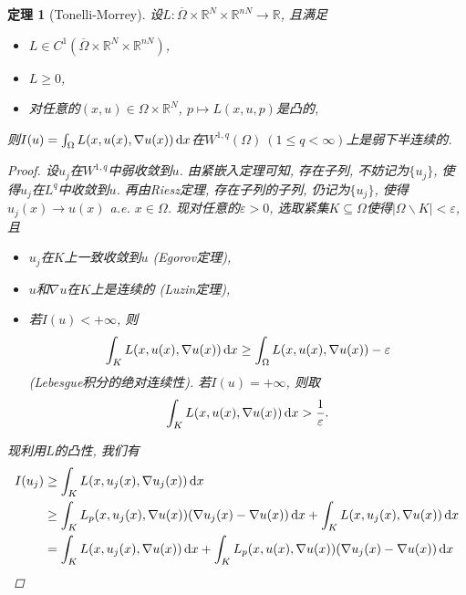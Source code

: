\documentclass[12pt,a4paper]{article}
\newtheorem{theorem}{定理}[section]
\begin{document}
\begin{theorem}[Tonelli-Morrey]
    设$L\colon \overline{\Omega} \times \mathbb{R}^N \times \mathbb{R}^{nN} \rightarrow \mathbb{R}$, 且满足 
    \begin{itemize}
        \item $L \in C^1(\overline{\Omega} \times \mathbb{R}^N \times \mathbb{R}^{nN})$, 
        \item $L \geq 0$,
        \item 对任意的$(x, u) \in \Omega \times \mathbb{R}^N$, $p \mapsto L(x, u, p)$是凸的,
    \end{itemize}
    则$I(u) = \int_{\Omega}L(x, u(x), \nabla u(x)) \,{\rm d}x$在$W^{1, q}(\Omega)\ (1 \leq q < \infty)$上是弱下半连续的.
    \begin{proof}
        设$u_j$在$W^{1, q}$中弱收敛到$u$. 由紧嵌入定理可知, 存在子列, 不妨记为$\{u_j\}$, 使得$u_j$在$L^q$中收敛到$u$.
        再由Riesz定理, 存在子列的子列, 仍记为$\{u_j\}$, 使得$u_j(x) \rightarrow u(x)$ a.e. $x \in \Omega$.
        现对任意的$\varepsilon > 0$, 选取紧集$K \subseteq \Omega$使得$|\Omega \smallsetminus K| < \varepsilon$, 且 
        \begin{itemize}
            \item $u_j$在$K$上一致收敛到$u$ (Egorov定理), 
            \item $u$和$\nabla u$在$K$上是连续的 (Luzin定理), 
            \item 若$I(u) < +\infty$, 则 
            \begin{equation*}
                \int_KL(x, u(x), \nabla u(x)) \,{\rm d}x \geq \int_{\Omega}L(x, u(x), \nabla u(x)) - \varepsilon
            \end{equation*}
            (Lebesgue积分的绝对连续性). 若$I(u) = +\infty$, 则取 
            \begin{equation*}
                \int_KL(x, u(x), \nabla u(x)) \,{\rm d}x > \frac{1}{\varepsilon}.
            \end{equation*}
        \end{itemize}
        现利用$L$的凸性, 我们有 
        \begin{align*}
            I(u_j) &\geq \int_KL(x, u_j(x), \nabla u_j(x)) \,{\rm d}x \\ 
            &\geq \int_KL_p(x, u_j(x), \nabla u(x))(\nabla u_j(x) - \nabla u(x)) \,{\rm d}x + \int_KL(x, u_j(x), \nabla u(x)) \,{\rm d}x \\ 
            &= \int_KL(x, u_j(x), \nabla u(x)) \,{\rm d}x + \int_KL_p(x, u(x), \nabla u(x))(\nabla u_j(x) - \nabla u(x)) \,{\rm d}x \\

\end{align*}
\end{proof}
\end{theorem}
\end{document}
